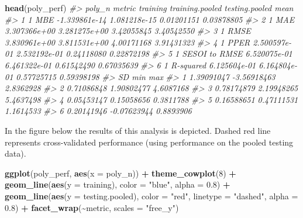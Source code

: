 \documentclass[
]{book}
\newenvironment{Shaded}{\begin{snugshade}}{\end{snugshade}}
\newcommand{\CommentTok}[1]{\textcolor[rgb]{0.56,0.35,0.01}{\textit{#1}}}
\newcommand{\DataTypeTok}[1]{\textcolor[rgb]{0.13,0.29,0.53}{#1}}
\newcommand{\DecValTok}[1]{\textcolor[rgb]{0.00,0.00,0.81}{#1}}
\newcommand{\FloatTok}[1]{\textcolor[rgb]{0.00,0.00,0.81}{#1}}
\newcommand{\KeywordTok}[1]{\textcolor[rgb]{0.13,0.29,0.53}{\textbf{#1}}}
\newcommand{\NormalTok}[1]{#1}
\newcommand{\OperatorTok}[1]{\textcolor[rgb]{0.81,0.36,0.00}{\textbf{#1}}}
\newcommand{\StringTok}[1]{\textcolor[rgb]{0.31,0.60,0.02}{#1}}
\begin{document}
\begin{Shaded}
\begin{Highlighting}[]
\KeywordTok{head}\NormalTok{(poly\_perf)}
\CommentTok{\#>   poly\_n        metric      training training.pooled testing.pooled       mean}
\CommentTok{\#> 1      1           MBE {-}1.339861e{-}14    1.081218e{-}15     0.01201151 0.03878805}
\CommentTok{\#> 2      1           MAE  3.307366e+00    3.281275e+00     3.42055845 3.40542550}
\CommentTok{\#> 3      1          RMSE  3.830961e+00    3.811531e+00     4.00171168 3.91431323}
\CommentTok{\#> 4      1          PPER  2.500597e{-}01    2.532192e{-}01     0.24118080 0.22872198}
\CommentTok{\#> 5      1 SESOI to RMSE  6.520075e{-}01    6.461322e{-}01     0.61542490 0.67035639}
\CommentTok{\#> 6      1     R{-}squared  6.125604e{-}01    6.164804e{-}01     0.57725715 0.59398198}
\CommentTok{\#>           SD         min       max}
\CommentTok{\#> 1 1.39091047 {-}3.56918463 2.8362928}
\CommentTok{\#> 2 0.71086848  1.90802477 4.6087168}
\CommentTok{\#> 3 0.78174879  2.19948265 5.4637498}
\CommentTok{\#> 4 0.05453147  0.15058656 0.3811788}
\CommentTok{\#> 5 0.16588651  0.47111531 1.1614533}
\CommentTok{\#> 6 0.20141946 {-}0.07623944 0.8893906}
\end{Highlighting}
\end{Shaded}

In the figure below the results of this analysis is depicted. Dashed red line represents cross-validated performance (using performance on the pooled testing data).

\begin{Shaded}
\begin{Highlighting}[]
\KeywordTok{ggplot}\NormalTok{(poly\_perf, }\KeywordTok{aes}\NormalTok{(}\DataTypeTok{x =}\NormalTok{ poly\_n)) }\OperatorTok{+}
\StringTok{  }\KeywordTok{theme\_cowplot}\NormalTok{(}\DecValTok{8}\NormalTok{) }\OperatorTok{+}
\StringTok{  }\KeywordTok{geom\_line}\NormalTok{(}\KeywordTok{aes}\NormalTok{(}\DataTypeTok{y =}\NormalTok{ training), }\DataTypeTok{color =} \StringTok{"blue"}\NormalTok{, }\DataTypeTok{alpha =} \FloatTok{0.8}\NormalTok{) }\OperatorTok{+}
\StringTok{  }\KeywordTok{geom\_line}\NormalTok{(}\KeywordTok{aes}\NormalTok{(}\DataTypeTok{y =}\NormalTok{ testing.pooled), }\DataTypeTok{color =} \StringTok{"red"}\NormalTok{, }\DataTypeTok{linetype =} \StringTok{"dashed"}\NormalTok{, }\DataTypeTok{alpha =} \FloatTok{0.8}\NormalTok{) }\OperatorTok{+}
\StringTok{  }\KeywordTok{facet\_wrap}\NormalTok{(}\OperatorTok{\textasciitilde{}}\NormalTok{metric, }\DataTypeTok{scales =} \StringTok{"free\_y"}\NormalTok{)}
\end{Highlighting}
\end{Shaded}
\end{document}

